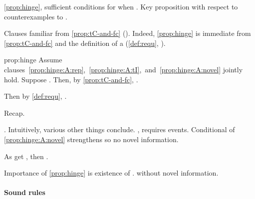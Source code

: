 \begin{note}
  \noindent%
  \autoref{prop:hinge}, sufficient conditions for \requ{} when \tCV{}.
  Key proposition with respect to counterexamples to \issueConstraint{}.

  Clauses familiar from \autoref{prop:tC-and-fc} ().
  Indeed, \autoref{prop:hinge} is immediate from \autoref{prop:tC-and-fc}  and the definition of a \requ{} (\autoref{def:requ}, ).

  \begin{argument}{prop:hinge}
    Assume~ clauses~\ref{prop:hinge:A:rep},~\ref{prop:hinge:A:tI},~and~\ref{prop:hinge:A:novel} jointly hold.
    Suppose \tCV{}.
    Then, by \autoref{prop:tC-and-fc}, \fc{}.

    Then by \autoref{def:requ}, \requ{}.
  \end{argument}

  Recap.

  \tCV{}.
  Intuitively, various other things conclude.
  \tRep{}, requires events.
  Conditional of \autoref{prop:hinge:A:novel} strengthens so no novel information.

  As get \fc{}, then \requ{}.

  Importance of \autoref{prop:hinge} is existence of \requ{}.
  \tCV{} without novel information.
\end{note}

\paragraph*{Sound rules}

